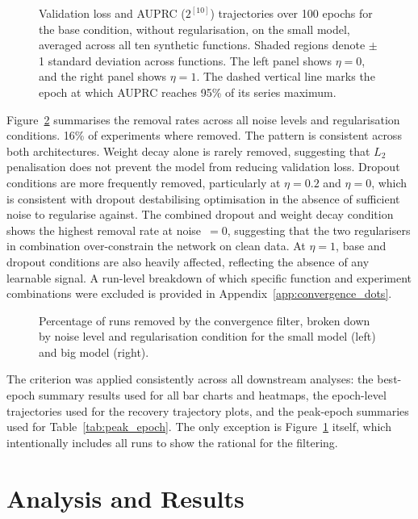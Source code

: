 \documentclass{article}
\begin{document}
\begin{figure}[htbp]
    \centering
    
    \caption{Validation loss and AUPRC ($2^{[10]}$) trajectories over 100 epochs for the base condition, without regularisation, on the small model, averaged across all ten synthetic functions. Shaded regions denote $\pm$ 1 standard deviation across functions. The left panel shows  $\eta =0$, and the right panel shows $\eta =1$. The dashed vertical line marks the epoch at which AUPRC reaches 95\% of its series maximum.}
    \label{fig:loss_vs_auprc_divergence}
\end{figure}

Figure~\ref{fig:convergence_removal} summarises the removal rates across all noise levels
and regularisation conditions. 16\% of experiments where removed. The pattern is consistent across both architectures.
Weight decay alone is rarely removed, suggesting that $L_2$ penalisation does not
prevent the model from reducing validation loss. Dropout conditions are more frequently
removed, particularly at $\eta= 0.2$ and $\eta= 0$, which is consistent with
dropout destabilising optimisation in the absence of sufficient noise to regularise
against. The combined dropout and weight decay condition shows the highest removal rate
at noise~$= 0$, suggesting that the two regularisers in combination over-constrain
the network on clean data. At $\eta= 1$, base and dropout conditions are also heavily
affected, reflecting the absence of any learnable signal. A run-level breakdown of which
specific function and experiment combinations were excluded is provided in
Appendix~\ref{app:convergence_dots}.

\begin{figure}[htbp]
    \centering
    
    \caption{Percentage of runs removed by the convergence filter, broken down by noise
    level and regularisation condition for the small model (left) and big model (right).}
    \label{fig:convergence_removal}
\end{figure}

The criterion was applied consistently across all downstream analyses: the best-epoch
summary results used for all bar charts and heatmaps, the epoch-level trajectories used
for the recovery trajectory plots, and the peak-epoch summaries used for
Table~\ref{tab:peak_epoch}. The only exception is Figure~\ref{fig:loss_vs_auprc_divergence}
itself, which intentionally includes all runs to show the rational for the filtering.
\FloatBarrier
\section{Analysis and Results}
\label{sec:results}
\end{document}
